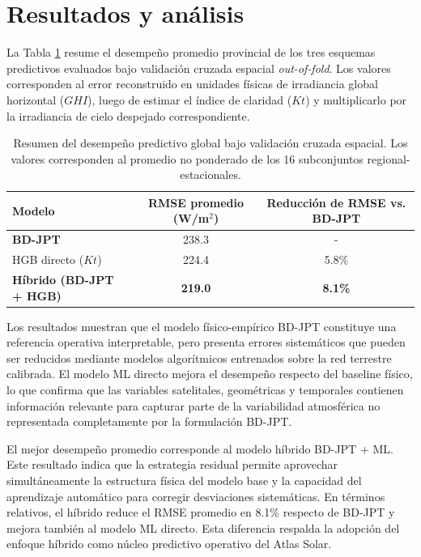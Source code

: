 \documentclass[../main.tex]{subfiles}
\begin{document}
\clearpage %

\section{Resultados y análisis}

La Tabla \ref{tab:resumen_metodologico} resume el desempeño promedio provincial de los tres esquemas predictivos evaluados bajo validación cruzada espacial \textit{out-of-fold}. Los valores corresponden al error reconstruido en unidades físicas de irradiancia global horizontal ($GHI$), luego de estimar el índice de claridad ($Kt$) y multiplicarlo por la irradiancia de cielo despejado correspondiente.

\begin{table}[htpb]
\centering
\caption{Resumen del desempeño predictivo global bajo validación cruzada espacial. Los valores corresponden al promedio no ponderado de los 16 subconjuntos regional-estacionales.}
\label{tab:resumen_metodologico}
\begin{tabular}{lcc}
\toprule
Modelo & RMSE promedio (W/m$^2$) & Reducción de RMSE vs. BD-JPT \\
\midrule
\textbf{BD-JPT} & 238.3 & - \\
HGB directo ($Kt$) & 224.4 & 5.8\% \\
\textbf{Híbrido (BD-JPT + HGB)} & \textbf{219.0} & \textbf{8.1\%} \\
\bottomrule
\end{tabular}
\end{table}

Los resultados muestran que el modelo físico-empírico BD-JPT constituye una referencia operativa interpretable, pero presenta errores sistemáticos que pueden ser reducidos mediante modelos algorítmicos entrenados sobre la red terrestre calibrada. El modelo ML directo mejora el desempeño respecto del baseline físico, lo que confirma que las variables satelitales, geométricas y temporales contienen información relevante para capturar parte de la variabilidad atmosférica no representada completamente por la formulación BD-JPT.

El mejor desempeño promedio corresponde al modelo híbrido BD-JPT + ML. Este resultado indica que la estrategia residual permite aprovechar simultáneamente la estructura física del modelo base y la capacidad del aprendizaje automático para corregir desviaciones sistemáticas. En términos relativos, el híbrido reduce el RMSE promedio en 8.1\% respecto de BD-JPT y mejora también al modelo ML directo. Esta diferencia respalda la adopción del enfoque híbrido como núcleo predictivo operativo del Atlas Solar.
\end{document}
